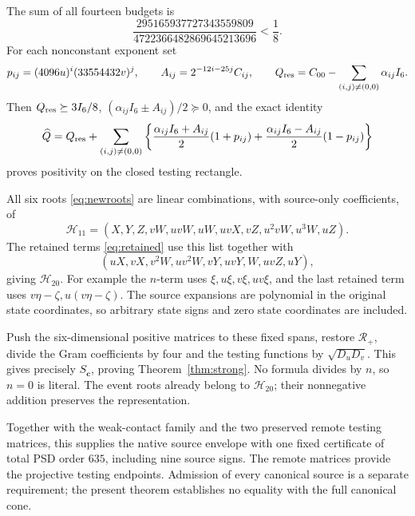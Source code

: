 \documentclass[10pt]{article}
\newcommand{\Du}{D_u}
\newcommand{\Dv}{D_v}
\begin{document}
The sum of all fourteen budgets is
\[
 \frac{295165937727343559809}{4722366482869645213696}<\frac18.
\]
For each nonconstant exponent set
\[
 p_{ij}=(4096u)^i(33554432v)^j,\qquad
 A_{ij}=2^{-12i-25j}C_{ij},\qquad
 Q_{\rm res}=C_{00}-\sum_{(i,j)\ne(0,0)}\alpha_{ij}I_6 .
\]
Then \(Q_{\rm res}\succeq3I_6/8\),
\((\alpha_{ij}I_6\pm A_{ij})/2\succeq0\), and the exact identity
\[
 \widehat Q=Q_{\rm res}+
 \sum_{(i,j)\ne(0,0)}
 \left\{\frac{\alpha_{ij}I_6+A_{ij}}2(1+p_{ij})
       +\frac{\alpha_{ij}I_6-A_{ij}}2(1-p_{ij})\right\}
\]
proves positivity on the closed testing rectangle.

All six roots \eqref{eq:newroots} are linear combinations, with source-only
coefficients, of
\[
 \mathcal H_{11}=(X,Y,Z,vW,uvW,uW,uvX,vZ,u^2vW,u^3W,uZ).
\]
The retained terms \eqref{eq:retained} use this list together with
\[
 (uX,vX,v^2W,uv^2W,vY,uvY,W,uvZ,uY),
\]
giving \(\mathcal H_{20}\). For example the \(n\)-term uses
\(\xi,u\xi,v\xi,uv\xi\), and the last retained term uses
\(v\eta-\zeta,u(v\eta-\zeta)\). The source expansions are polynomial
in the original state coordinates, so arbitrary state signs and
zero state coordinates are included.

Push the six-dimensional positive matrices to these fixed spans,
restore \(\mathcal R_+\), divide the Gram coefficients by four and
the testing functions by \(\sqrt{\Du\Dv}\).
This gives precisely \(S_{\mathbf c}\), proving Theorem~\ref{thm:strong}.
No formula divides by \(n\), so \(n=0\) is literal.
The event roots already belong to \(\mathcal H_{20}\); their nonnegative
addition preserves the representation.

Together with the weak-contact family and the two preserved remote
testing matrices, this supplies the native source envelope with one
fixed certificate of total PSD order \(635\), including nine source
signs. The remote matrices provide the projective testing endpoints.
Admission of every canonical source is a separate requirement; the
present theorem establishes no equality with the full canonical cone.
\end{document}
